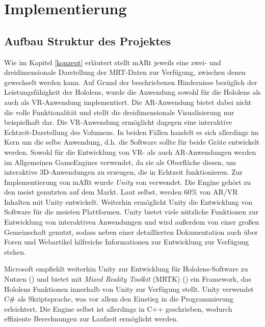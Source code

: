 
\chapter{Implementierung}
\label{implementierung}

\section{Aufbau Struktur des Projektes}

Wie im Kapitel \ref{konzept} erläutert stellt mARt jeweils eine zwei- und dreidimensionale Darstellung der MRT-Daten zur Verfügung, zwischen denen gewechselt werden kann. Auf Grund der beschriebenen Hindernisse bezüglich der Leistungsfähigkeit der Hololens, wurde die Anwendung sowohl für die Hololens als auch als VR-Anwendung implementiert. Die AR-Anwendung bietet dabei nicht die volle Funktionalität und stellt die dreidimensionale Visualisierung nur beispielhaft dar. Die VR-Anwendung ermöglicht dagegen eine interaktive Echtzeit-Darstellung des Volumens. In beiden Fällen handelt es sich allerdings im Kern um die selbe Anwendung, d.h. die Software sollte für beide Gräte entwickelt werden. 
Sowohl für die Entwicklung von VR- als auch AR-Anwendungen werden im Allgemeinen GameEngines verwendet, da sie als Oberfläche diesen, um interaktive 3D-Anwendungen zu erzeugen, die in Echtzeit funktionieren. 
Zur Implementierung von mARt wurde \textit{Unity} von \cite{unity} verwendet. Die Engine gehört zu den meist genutzten auf dem Markt. Laut \cite{unityRelations} selbst, werden 60\% von AR/VR Inhalten mit Unity entwickelt. Weiterhin ermöglicht Unity die Entwicklung von Software für die meisten Plattformen. Unity bietet viele nützliche Funktionen zur Entwicklung von interaktiven Anwendungen und wird außerdem von einer großen  Gemeinschaft genutzt, sodass neben einer detaillierten Dokumentation auch über Foren und Webartikel hilfreiche Informationen zur Entwicklung zur Verfügung stehen.

Microsoft empfiehlt weiterhin Unity zur Entwicklung für Hololens-Software zu Nutzen (\cite{unityHololens}) und bietet mit \textit{Mixed Reality Toolkit} (MRTK) (\cite{holoToolkit}) ein Framework, das Hololens Funktionen innerhalb von Unity zur Verfügung stellt.
Unity verwendet C\# als Skriptsprache, was vor allem den Einstieg in die Programmierung erleichtert. Die Engine selbst ist allerdings in C++ geschrieben, wodurch effiziente Berechnungen zur Laufzeit ermöglicht werden.

